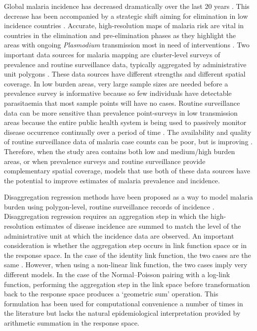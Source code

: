 \documentclass{statsoc}
\begin{document}
Global malaria incidence has decreased dramatically over the last 20 years \citep{bhatt2015effect, weiss2019mapping, battle2019mapping}.
This decrease has been accompanied by a strategic shift aiming for elimination in low incidence countries \citep{world2016world, newby2016path}.
Accurate, high-resolution maps of malaria risk are vital in countries in the elimination and pre-elimination phases as they highlight the areas with ongoing \emph{Plasmodium} transmission most in need of interventions \citep{sturrock2016mapping, cohen2017mapping}.
Two important data sources for malaria mapping are cluster-level surveys of prevalence \citep{gething2011new, bhatt2017improved, gething2012long, bhatt2015effect} and routine surveillance data, typically aggregated by administrative unit polygons \citep{sturrock2016mapping, ohrt2015information, cibulskis2011worldwide}.
These data sources have different strengths and different spatial coverage.
In low burden areas, very large sample sizes are needed before a prevalence survey is informative because so few individuals have detectable parasitaemia that most sample points will have no cases.
Routine surveillance data can be more sensitive than prevalence point-surveys in low transmission areas because the entire public health system is being used to passively monitor disease occurrence continually over a period of time \citep{cibulskis2011worldwide}.
The availability and quality of routine surveillance data of malaria case counts can be poor, but is improving \citep{ohrt2015information, cibulskis2011worldwide}.
Therefore, when the study area contains both low and medium/high burden areas, or when prevalence surveys and routine surveillance provide complementary spatial coverage, models that use both of these data sources have the potential to improve estimates of malaria prevalence and incidence.

Disaggregation regression methods have been proposed as a way to model malaria burden using polygon-level, routine surveillance records of incidence \citep{sturrock2014fine, wilson2017pointless, law2018variational, taylor2017continuous, li2012log, johnson2019spatially}.
Disaggregation regression requires an aggregation step in which the high-resolution estimates of disease incidence are summed to match the level of the administrative unit at which the incidence data are observed.
An important consideration is whether the aggregation step occurs in link function space or in the response space.
In the case of the identity link function, the two cases are the same \citep{moraga2017geostatistical, roksvaag2019knowledge, wilson2017pointless}.
However, when using a non-linear link function, the two cases imply very different models.
In the case of the Normal--Poisson pairing  with a log-link function, performing the aggregation step in the link space before transformation back to the response space produces  a `geometric sum' operation.
This formulation has been used for computational convenience a number of times in the literature \citep{wang2018generalized, liu2011empirical} but lacks the natural epidemiological interpretation provided by arithmetic summation in the response space.
\end{document}
